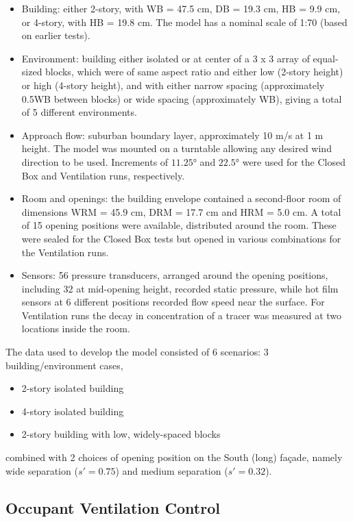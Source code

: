 \begin{itemize}
\item Building: either 2-story, with WB = 47.5 cm, DB = 19.3 cm, HB = 9.9 cm, or 4-story, with HB = 19.8 cm. The model has a nominal scale of 1:70 (based on earlier tests).
\item Environment: building either isolated or at center of a 3 x 3 array of equal-sized blocks, which were of same aspect ratio and either low (2-story height) or high (4-story height), and with either narrow spacing (approximately 0.5WB between blocks) or wide spacing (approximately WB), giving a total of 5 different environments.
\item Approach flow: suburban boundary layer, approximately 10 m/s at 1 m height. The model was mounted on a turntable allowing any desired wind direction to be used. Increments of $\ang{11.25}$ and $\ang{22.5}$ were used for the Closed Box and Ventilation runs, respectively.
\item Room and openings: the building envelope contained a second-floor room of dimensions WRM = 45.9 cm, DRM = 17.7 cm and HRM = 5.0 cm. A total of 15 opening positions were available, distributed around the room. These were sealed for the Closed Box tests but opened in various combinations for the Ventilation runs.
\item Sensors: 56 pressure transducers, arranged around the opening positions, including 32 at mid-opening height, recorded static pressure, while hot film sensors at 6 different positions recorded flow speed near the surface. For Ventilation runs the decay in concentration of a tracer was measured at two locations inside the room.
\end{itemize}

The data used to develop the model consisted of 6 scenarios: 3 building/environment cases,
\begin{itemize}
\item 2-story isolated building
\item 4-story isolated building
\item 2-story building with low, widely-spaced blocks
\end{itemize}
combined with 2 choices of opening position on the South (long) fa\c{c}ade, namely wide separation ($s' = 0.75$) and medium separation ($s' = 0.32$).

\subsection{Occupant Ventilation Control}\label{occupant-ventilation-control}

